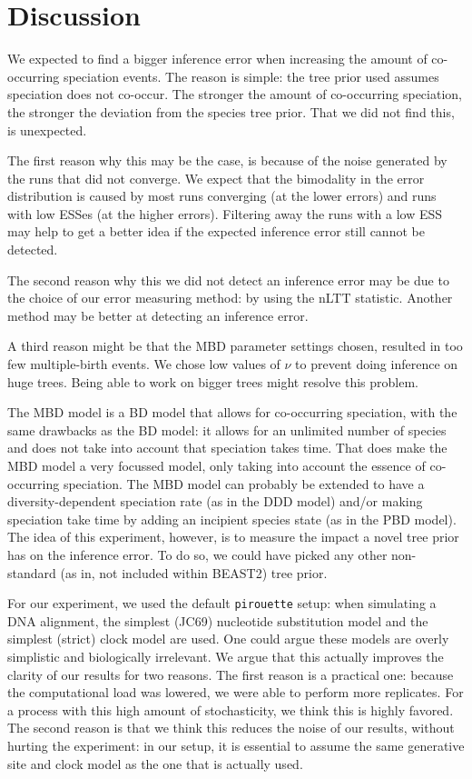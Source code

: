 \section{Discussion}

We expected to find a bigger inference error 
when increasing the amount of co-occurring speciation events.
The reason is simple: the tree prior used assumes speciation does not
co-occur. The stronger the amount of co-occurring speciation, the stronger
the deviation from the species tree prior. That we did not find this, 
is unexpected.

The first reason why this may be the case, is because of the noise
generated by the runs that did not converge. We expect that the bimodality
in the error distribution is caused by most runs converging (at the lower
errors) and runs with low ESSes (at the higher errors). Filtering away
the runs with a low ESS may help to get a better idea if the expected
inference error still cannot be detected.

The second reason why this we did not detect an inference error may
be due to the choice of our error measuring method: by using the nLTT
statistic. Another method may be better at detecting an inference error.

A third reason might be that the MBD parameter settings chosen, resulted
in too few multiple-birth events. We chose low values of $\nu$ to
prevent doing inference on huge trees. Being able to work on bigger
trees might resolve this problem.

The MBD model is a BD model that allows for co-occurring speciation,
with the same drawbacks as the BD model: it allows for an unlimited 
number of species and does not take into account that speciation takes time.
That does make the MBD model a very focussed model, only taking into 
account the essence of co-occurring speciation. The MBD model can probably
be extended to have a diversity-dependent speciation rate (as in the 
DDD model) and/or making speciation take time by adding 
an incipient species state (as in the PBD model).
The idea of this experiment, however, is to measure the impact a novel
tree prior has on the inference error. To do so, we could have picked
any other non-standard (as in, not included within BEAST2) tree prior.

For our experiment, we used the default \verb;pirouette; setup:
when simulating a DNA alignment, the simplest (JC69) nucleotide
substitution model and the simplest (strict) clock model are used. 
One could argue these models
are overly simplistic and biologically irrelevant. We argue that this
actually improves the clarity of our results for two reasons. The first
reason is a practical one: because the computational load was lowered,
we were able to perform more replicates. For a process with this high
amount of stochasticity, we think this is highly favored. The second reason
is that we think this reduces the noise of our results, without 
hurting the experiment: in our setup, it is essential
to assume the same generative site and clock model as the one that is actually 
used.

